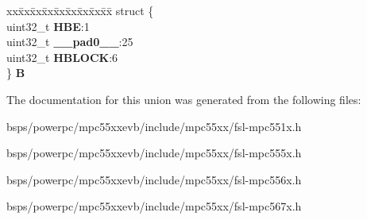 \begin{DoxyCompactItemize}
\begin{tabbing}
\end{tabbing}\item 
\mbox{\label{unionFLASH__tag_1_1HLR__tag_ae69f3a99d85a477c0d58b0d26337606f}} 
\begin{tabbing}
xx\=xx\=xx\=xx\=xx\=xx\=xx\=xx\=xx\=\kill
struct \{\\
\>uint32\_t {\bfseries HBE}:1\\
\>uint32\_t {\bfseries \_\_pad0\_\_}:25\\
\>uint32\_t {\bfseries HBLOCK}:6\\
\} {\bfseries B}\\

\end{tabbing}\end{DoxyCompactItemize}


The documentation for this union was generated from the following files\+:\begin{DoxyCompactItemize}
\item 
bsps/powerpc/mpc55xxevb/include/mpc55xx/fsl-\/mpc551x.\+h\item 
bsps/powerpc/mpc55xxevb/include/mpc55xx/fsl-\/mpc555x.\+h\item 
bsps/powerpc/mpc55xxevb/include/mpc55xx/fsl-\/mpc556x.\+h\item 
bsps/powerpc/mpc55xxevb/include/mpc55xx/fsl-\/mpc567x.\+h\end{DoxyCompactItemize}

